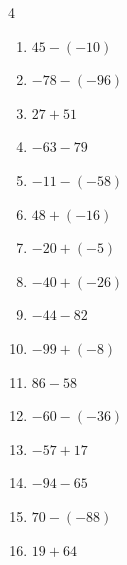 \begin{multicols}{4}
\begin{enumerate}
  \item $45-(-10)$

        \phantom{$=55$}

  \item $-78-(-96)$

        \phantom{$=18$}

\columnbreak %

  \item $27+51$

        \phantom{$=78$}

  \item $-63-79$

        \phantom{$=-142$}

  \item $-11-(-58)$

        \phantom{$=47$}

  \item $48+(-16)$

        \phantom{$=32$}

  \item $-20+(-5)$

        \phantom{$=-25$}

  \item $-40+(-26)$

        \phantom{$=-66$}

  \item $-44-82$

        \phantom{$=-126$}

  \item $-99+(-8)$

        \phantom{$=-107$}

  \item $86-58$

        \phantom{$=28$}

  \item $-60-(-36)$

        \phantom{$=-24$}

  \item $-57+17$

        \phantom{$=-40$}

  \item $-94-65$

        \phantom{$=-159$}

  \item $70-(-88)$

        \phantom{$=158$}

  \item $19+64$


\end{enumerate}
\end{multicols}
